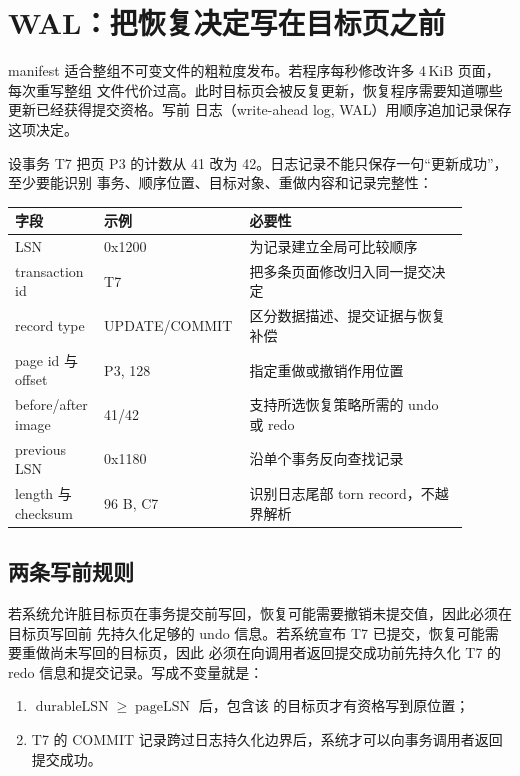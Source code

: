 \section{WAL：把恢复决定写在目标页之前}

manifest 适合整组不可变文件的粗粒度发布。若程序每秒修改许多 4\,KiB 页面，每次重写整组
文件代价过高。此时目标页会被反复更新，恢复程序需要知道哪些更新已经获得提交资格。写前
日志（write-ahead log, WAL）用顺序追加记录保存这项决定。

设事务 T7 把页 P3 的计数从 41 改为 42。日志记录不能只保存一句“更新成功”，至少要能识别
事务、顺序位置、目标对象、重做内容和记录完整性：

\begin{longtable}{|L{0.18\linewidth}|L{0.25\linewidth}|L{0.47\linewidth}|}
\hline
字段 & 示例 & 必要性 \\ \hline
LSN & 0x1200 & 为记录建立全局可比较顺序 \\\tablerowrule
transaction id & T7 & 把多条页面修改归入同一提交决定 \\\tablerowrule
record type & UPDATE/COMMIT & 区分数据描述、提交证据与恢复补偿 \\\tablerowrule
page id 与 offset & P3, 128 & 指定重做或撤销作用位置 \\\tablerowrule
before/after image & 41/42 & 支持所选恢复策略所需的 undo 或 redo \\\tablerowrule
previous LSN & 0x1180 & 沿单个事务反向查找记录 \\\tablerowrule
length 与 checksum & 96 B, C7 & 识别日志尾部 torn record，不越界解析 \\
\hline
\end{longtable}

\subsection{两条写前规则}

若系统允许脏目标页在事务提交前写回，恢复可能需要撤销未提交值，因此必须在目标页写回前
先持久化足够的 undo 信息。若系统宣布 T7 已提交，恢复可能需要重做尚未写回的目标页，因此
必须在向调用者返回提交成功前先持久化 T7 的 redo 信息和提交记录。写成不变量就是：

\begin{enumerate}
\tightlist
\item \(\operatorname{durableLSN} \geq \operatorname{pageLSN}\) 后，包含该
       的目标页才有资格写到原位置；
\item T7 的 COMMIT 记录跨过日志持久化边界后，系统才可以向事务调用者返回提交成功。
\end{enumerate}

